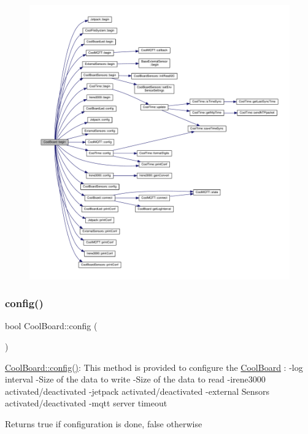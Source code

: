 \begin{figure}[H]
\begin{center}
\leavevmode
\includegraphics[width=350pt]{classCoolBoard_acba7c5aef7268b2c0044bdb54d3b9d76_cgraph}
\end{center}
\end{figure}
\mbox{\label{classCoolBoard_a583a874c09c07e70a6eb9229fc4beddb}} 
\subsubsection{\texorpdfstring{config()}{config()}}
{\footnotesize\ttfamily bool Cool\+Board\+::config (\begin{DoxyParamCaption}{ }\end{DoxyParamCaption})}

\hyperlink{classCoolBoard_a583a874c09c07e70a6eb9229fc4beddb}{Cool\+Board\+::config()}\+: This method is provided to configure the \hyperlink{classCoolBoard}{Cool\+Board} \+: -\/log interval -\/\+Size of the data to write -\/\+Size of the data to read -\/irene3000 activated/deactivated -\/jetpack activated/deactivated -\/external Sensors activated/deactivated -\/mqtt server timeout

\begin{DoxyReturn}{Returns}
true if configuration is done, false otherwise 
\end{DoxyReturn}


